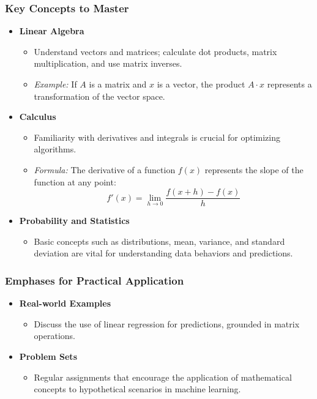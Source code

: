 \documentclass[aspectratio=169]{beamer}
\begin{document}
\begin{frame}[fragile]
    \frametitle{Key Concepts to Master}
    \begin{itemize}
        \item \textbf{Linear Algebra}
        \begin{itemize}
            \item Understand vectors and matrices; calculate dot products, matrix multiplication, and use matrix inverses.
            \item \textit{Example:} If $A$ is a matrix and $x$ is a vector, the product $A \cdot x$ represents a transformation of the vector space.
        \end{itemize}
        
        \item \textbf{Calculus}
        \begin{itemize}
            \item Familiarity with derivatives and integrals is crucial for optimizing algorithms.
            \item \textit{Formula:} The derivative of a function \( f(x) \) represents the slope of the function at any point:
            \begin{equation}
                f'(x) = \lim_{{h \to 0}} \frac{{f(x+h) - f(x)}}{h}
            \end{equation}
        \end{itemize}
        
        \item \textbf{Probability and Statistics}
        \begin{itemize}
            \item Basic concepts such as distributions, mean, variance, and standard deviation are vital for understanding data behaviors and predictions.
        \end{itemize}
    \end{itemize}
\end{frame}

\begin{frame}[fragile]
    \frametitle{Emphases for Practical Application}
    \begin{itemize}
        \item \textbf{Real-world Examples}
        \begin{itemize}
            \item Discuss the use of linear regression for predictions, grounded in matrix operations.
        \end{itemize}
        
        \item \textbf{Problem Sets}
        \begin{itemize}
            \item Regular assignments that encourage the application of mathematical concepts to hypothetical scenarios in machine learning.
        \end{itemize}
    \end{itemize}
\end{frame}
\end{document}
